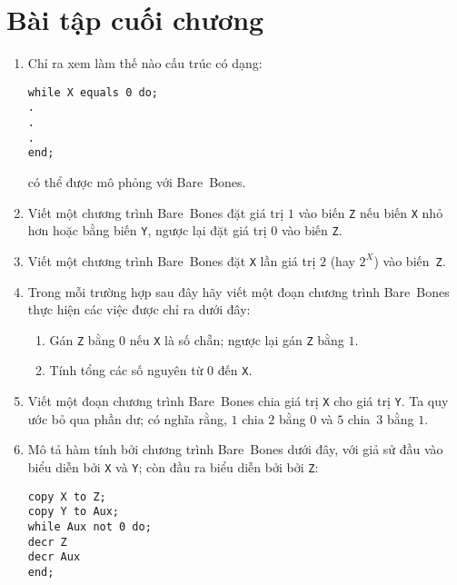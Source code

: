 \section{Bài tập cuối chương}
  

\begin{multicols}{2}
  \begin{enumerate}

  \item Chỉ ra xem làm thế nào cấu trúc có dạng:
    \begin{flushleft}
      \quad\texttt{while X equals 0 do;} \\
      \quad\quad \texttt{.} \\
      \quad\quad \texttt{.} \\
      \quad\quad \texttt{.} \\
      \quad\texttt{end;}
    \end{flushleft}
    có thể được mô phỏng với Bare~Bones.

  \item Viết một chương trình Bare~Bones đặt giá trị $1$ vào biến \texttt{Z} nếu biến
    \texttt{X} nhỏ hơn hoặc bằng biến \texttt{Y}, ngược lại đặt giá trị $0$ vào biến
    \texttt{Z}.

  \item Viết một chương trình Bare~Bones đặt \texttt{X} lần giá trị $2$ (hay $2^X$) vào
    biến~\texttt{Z}.

  \item Trong mỗi trường hợp sau đây hãy viết một đoạn chương trình Bare~Bones thực hiện
    các việc được chỉ ra dưới đây:
    \begin{enumerate}
    \item Gán \texttt{Z} bằng $0$ nếu \texttt{X} là số chẵn; ngược lại gán \texttt{Z} bằng
      $1$.

    \item Tính tổng các số nguyên từ $0$ đến \texttt{X}.
    \end{enumerate}


  \item Viết một đoạn chương trình Bare~Bones chia giá trị \texttt{X} cho giá trị
    \texttt{Y}. Ta quy ước bỏ qua phần dư; có nghĩa rằng, $1$ chia $2$ bằng $0$ và $5$
    chia~$3$ bằng $1$.

  \item Mô tả hàm tính bởi chương trình Bare~Bones dưới đây, với giả sử đầu vào biểu diễn
    bởi \texttt{X} và \texttt{Y}; còn đầu ra biểu diễn bởi bởi \texttt{Z}:
    \begin{flushleft}
      \quad\texttt{copy X to Z;} \\
      \quad\texttt{copy Y to Aux;} \\
      \quad\texttt{while Aux not 0 do;} \\
      \quad\quad \texttt{decr Z} \\
      \quad\quad \texttt{decr Aux} \\
      \quad\texttt{end;}
    \end{flushleft}


\end{enumerate}
\end{multicols}
